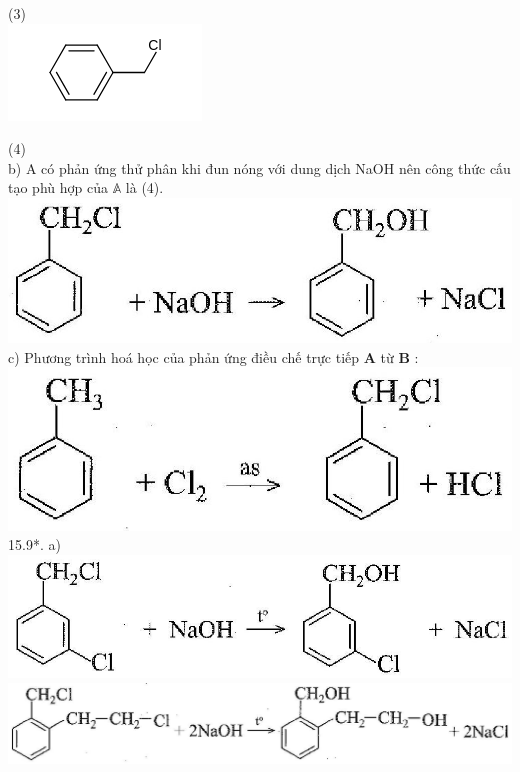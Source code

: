 \documentclass[10pt]{article}
\begin{document}
(3)\\
\includegraphics{smile-d76584a686c8324284ff8b4f33fb5036eb5184e2}

(4)\\
b) A có phản ứng thử phân khi đun nóng với dung dịch NaOH nên công thức cấu tạo phù hợp của $\mathbb{A}$ là (4).\\
\includegraphics[max width=\textwidth, center]{2025_10_23_052d3249fabea90c1e95g-23}\\
c) Phương trình hoá học của phản ứng điều chế trực tiếp $\mathbf{A}$ từ $\mathbf{B}$ :\\
\includegraphics[max width=\textwidth, center]{2025_10_23_052d3249fabea90c1e95g-23(2)}\\
15.9*. a)\\
\includegraphics[max width=\textwidth, center]{2025_10_23_052d3249fabea90c1e95g-23(1)}\\
\includegraphics[max width=\textwidth, center]{2025_10_23_052d3249fabea90c1e95g-23(3)}\\
\end{document}
